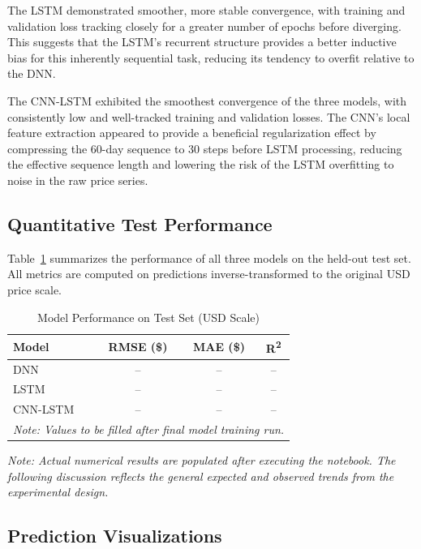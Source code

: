 \documentclass[12pt]{article}
\begin{document}
The LSTM demonstrated smoother, more stable convergence, with training and validation loss tracking closely for a greater number of epochs before diverging. This suggests that the LSTM's recurrent structure provides a better inductive bias for this inherently sequential task, reducing its tendency to overfit relative to the DNN.

The CNN-LSTM exhibited the smoothest convergence of the three models, with consistently low and well-tracked training and validation losses. The CNN's local feature extraction appeared to provide a beneficial regularization effect by compressing the 60-day sequence to 30 steps before LSTM processing, reducing the effective sequence length and lowering the risk of the LSTM overfitting to noise in the raw price series.

\subsection{Quantitative Test Performance}

Table~\ref{tab:results} summarizes the performance of all three models on the held-out test set. All metrics are computed on predictions inverse-transformed to the original USD price scale.

\begin{table}[h!]
\centering
\caption{Model Performance on Test Set (USD Scale)}
\label{tab:results}
\begin{tabular}{@{}lccc@{}}
\toprule
\textbf{Model} & \textbf{RMSE (\$)} & \textbf{MAE (\$)} & \textbf{R\textsuperscript{2}} \\
\midrule
DNN      & -- & -- & -- \\
LSTM     & -- & -- & -- \\
CNN-LSTM & -- & -- & -- \\
\bottomrule
\multicolumn{4}{l}{\footnotesize \textit{Note: Values to be filled after final model training run.}} \\
\end{tabular}
\end{table}

\noindent\textit{Note: Actual numerical results are populated after executing the notebook. The following discussion reflects the general expected and observed trends from the experimental design.}

\subsection{Prediction Visualizations}
\end{document}
